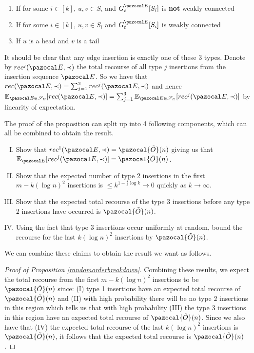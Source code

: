 \documentclass{report}
\begin{document}
\begin{enumerate}[Type 1.]
    \item If for some $i \in [k]$, $u,v \in S_{i}$ and $G_{t}^{\pazocal E}[S_{i}]$ is \textbf{not} weakly connected
    \item If for some $i \in [k]$, $u,v \in S_{i}$ and $G_{t}^{\pazocal E}[S_{i}]$ is weakly connected
    \item If $u$ is a head and $v$ is a tail
\end{enumerate}

It should be clear that any edge insertion is exactly one of these 3 types. Denote by $rec^{j}(\pazocal E, \prec)$ the total recourse of all type $j$ insertions from the insertion sequence $\pazocal E$. So we have that $rec(\pazocal E, \prec) = \sum_{j=1}^{3}rec^{j}(\pazocal E, \prec)$ and hence $\mathbb{E}_{\pazocal E \in \mathcal S_E}[rec(\pazocal E, \prec)] = \sum_{j=1}^{3}\mathbb{E}_{\pazocal E \in \mathcal S_E}[rec^j(\pazocal E, \prec)]$ by linearity of expectation.

The proof of the proposition can split up into 4 following components, which can all be combined to obtain the result.

\begin{enumerate}[I.]
    \item Show that $rec^{1}(\pazocal E, \prec)=\pazocal{\tilde{O}}(n)$ giving us that $\mathbb{E}_{\pazocal E}[rec^{j}(\pazocal E, \prec)]=\pazocal{\tilde{O}}(n)$.
    \item Show that the expected number of type 2 insertions in the first $m-k(\log n)^2$ insertions is $ \leq k^{1-\frac{8}{3}\log k} \rightarrow 0$ quickly as $k \rightarrow \infty$.
    \item Show that the expected total recourse of the type 3 insertions before any type 2 insertions have occurred is $\pazocal{\tilde{O}}(n)$.
    \item Using the fact that type 3 insertions occur uniformly at random, bound the recourse for the last $k(\log n)^2$ insertions by $\pazocal{\tilde{O}}(n) $.
\end{enumerate}

We can combine these claims to obtain the result we want as follows.

\begin{proof}[Proof of Proposition \ref{randomorderbreakdown}]
Combining these results, we expect the total recourse from the first $m-k(\log n)^2$ insertions to be $\pazocal{\tilde{O}}(n)$ since: (I) type 1 insertions have an expected total recourse of $\pazocal{\tilde{O}}(n)$ and (II) with high probability there will be no type 2 insertions in this region which tells us that with high probability (III) the type 3 insertions in this region have an expected total recourse of $\pazocal{\tilde{O}}(n)$. Since we also have that (IV) the expected total recourse of the last $k (\log n)^2$ insertions is $\pazocal{\tilde{O}}(n)$, it follows that the expected total recourse is $\pazocal{\tilde{O}}(n)$.
\end{proof}
\end{document}
